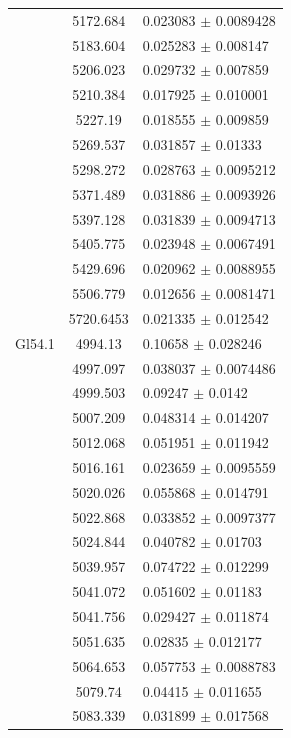 \begin{longtable}{|c|c|l|}
 & 5172.684 & 0.023083 $\pm$ 0.0089428 \\       
 & 5183.604 & 0.025283 $\pm$ 0.008147 \\        
 & 5206.023 & 0.029732 $\pm$ 0.007859 \\        
 & 5210.384 & 0.017925 $\pm$ 0.010001 \\        
 & 5227.19 & 0.018555 $\pm$ 0.009859 \\         
 & 5269.537 & 0.031857 $\pm$ 0.01333 \\         
 & 5298.272 & 0.028763 $\pm$ 0.0095212 \\       
 & 5371.489 & 0.031886 $\pm$ 0.0093926 \\       
 & 5397.128 & 0.031839 $\pm$ 0.0094713 \\       
 & 5405.775 & 0.023948 $\pm$ 0.0067491 \\       
 & 5429.696 & 0.020962 $\pm$ 0.0088955 \\       
 & 5506.779 & 0.012656 $\pm$ 0.0081471 \\       
 & 5720.6453 & 0.021335 $\pm$ 0.012542 \\       
\hline                                          
Gl54.1 & 4994.13 & 0.10658 $\pm$ 0.028246 \\    
 & 4997.097 & 0.038037 $\pm$ 0.0074486 \\       
 & 4999.503 & 0.09247 $\pm$ 0.0142 \\           
 & 5007.209 & 0.048314 $\pm$ 0.014207 \\        
 & 5012.068 & 0.051951 $\pm$ 0.011942 \\        
 & 5016.161 & 0.023659 $\pm$ 0.0095559 \\       
 & 5020.026 & 0.055868 $\pm$ 0.014791 \\        
 & 5022.868 & 0.033852 $\pm$ 0.0097377 \\       
 & 5024.844 & 0.040782 $\pm$ 0.01703 \\         
 & 5039.957 & 0.074722 $\pm$ 0.012299 \\        
 & 5041.072 & 0.051602 $\pm$ 0.01183 \\         
 & 5041.756 & 0.029427 $\pm$ 0.011874 \\        
 & 5051.635 & 0.02835 $\pm$ 0.012177 \\         
 & 5064.653 & 0.057753 $\pm$ 0.0088783 \\       
 & 5079.74 & 0.04415 $\pm$ 0.011655 \\          
 & 5083.339 & 0.031899 $\pm$ 0.017568 \\        

\end{longtable}
